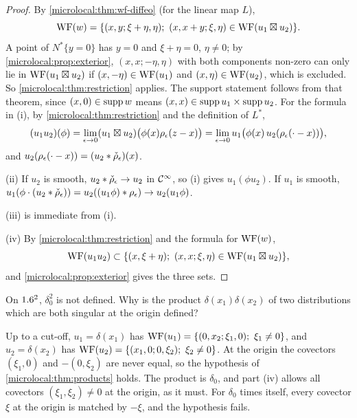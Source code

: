 \begin{proof}
  By \cref{microlocal:thm:wf-diffeo} (for the linear map $L$),
  \begin{equation*}
    \WF(w)=\{(x,y;\xi+\eta,\eta);\ (x,x+y;\xi,\eta)\in\WF(u_1\boxtimes u_2)\}.
  \end{equation*}
  A point of $N^*\{y=0\}$ has $y=0$ and $\xi+\eta=0$, $\eta\ne0$; by
  \cref{microlocal:prop:exterior}, $(x,x;-\eta,\eta)$ with both components
  non-zero can only lie in $\operatorname{WF}(u_1\boxtimes u_2)$ if $(x,-\eta)\in\operatorname{WF}(u_1)$
  and $(x,\eta)\in\operatorname{WF}(u_2)$, which is excluded. So
  \cref{microlocal:thm:restriction} applies. The support statement follows
  from that theorem, since $(x,0)\in\operatorname{supp} w$ means $(x,x)\in\operatorname{supp} u_1\times\operatorname{supp}
  u_2$. For the formula in (i), by \cref{microlocal:thm:restriction} and the
  definition of $L^*$,
  \begin{equation*}
    (u_1u_2)(\phi)=\lim_{\epsilon\to0}(u_1\boxtimes u_2)\bigl(\phi(x)\rho_\epsilon(z-x)\bigr)
    =\lim_{\epsilon\to0}u_1\bigl(\phi(x)\,u_2(\rho_\epsilon(\cdot-x))\bigr),
  \end{equation*}
  and $u_2(\rho_\epsilon(\cdot-x))=(u_2*\check\rho_\epsilon)(x)$.

  (ii) If $u_2$ is smooth, $u_2*\check\rho_\epsilon\to u_2$ in $\mathcal{C}^\infty$, so (i) gives
  $u_1(\phi u_2)$. If $u_1$ is smooth,
  $u_1(\phi\cdot(u_2*\check\rho_\epsilon))=u_2((u_1\phi)*\rho_\epsilon)\to u_2(u_1\phi)$.

  (iii) is immediate from (i).

  (iv) By \cref{microlocal:thm:restriction} and the formula for $\operatorname{WF}(w)$,
  \begin{equation*}
    \WF(u_1u_2)\subset\{(x,\xi+\eta);\ (x,x;\xi,\eta)\in\WF(u_1\boxtimes u_2)\},
  \end{equation*}
  and \cref{microlocal:prop:exterior} gives the three sets.
\end{proof}

\begin{question}
  On $1.6^2$, $\delta_0^2$ is not defined. Why is the product
  $\delta(x_1)\delta(x_2)$ of two distributions which are both singular at the
  origin defined?
\end{question}
\begin{answer}
  Up to a cut-off, $u_1=\delta(x_1)$ has
  $\WF(u_1)=\{(0,x_2;\xi_1,0);\ \xi_1\ne0\}$, and $u_2=\delta(x_2)$ has
  $\WF(u_2)=\{(x_1,0;0,\xi_2);\ \xi_2\ne0\}$. At the origin the covectors
  $(\xi_1,0)$ and $-(0,\xi_2)$ are never equal, so the hypothesis of
  \cref{microlocal:thm:products} holds. The product is $\delta_0$, and part (iv)
  allows all covectors $(\xi_1,\xi_2)\ne0$ at the origin, as it must. For
  $\delta_0$ times itself, every covector $\xi$ at the origin is matched by
  $-\xi$, and the hypothesis fails.
\end{answer}

